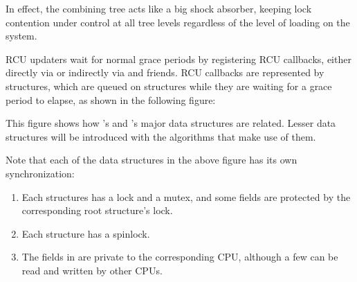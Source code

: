 In effect, the combining tree acts like a big shock absorber, keeping
lock contention under control at all tree levels regardless of the level
of loading on the system.

RCU updaters wait for normal grace periods by registering RCU callbacks,
either directly via  or indirectly via
 and friends.
RCU callbacks are represented by
 structures, which are queued on  structures
while they are waiting for a grace period to elapse, as shown in the
following figure:

\begin{center}
\end{center}

This figure shows how 's and 's major data
structures are related.
Lesser data structures will be introduced with
the algorithms that make use of them.

Note that each of the data structures in the above figure has its own
synchronization:

\begin{enumerate}
\item Each  structures has a lock and a mutex, and some fields
   are protected by the corresponding root  structure's lock.
\item Each  structure has a spinlock.
\item The fields in  are private to the corresponding CPU,
   although a few can be read and written by other CPUs.
\end{enumerate}

